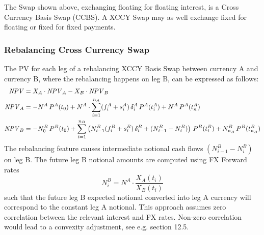 \medskip
The Swap shown above, exchanging floating for floating interest, is a Cross Currency 
Basis Swap (CCBS). A XCCY Swap may as well exchange fixed for floating or 
fixed for fixed payments. 

\subsubsection*{Rebalancing Cross Currency Swap}

The PV for each leg of a rebalancing XCCY Basis Swap between currency A and currency B, 
where the rebalancing happens on leg B, can be expressed as follows:
\begin{align*}
\mathit{NPV} &= X_A\cdot \mathit{NPV}_A - X_B\cdot \mathit{NPV}_B \\
\mathit{NPV}_A &= -N^A \,P^A(t_0) + N^A\cdot \sum_{i=1}^{n_A} (f^A_i + s^A_i)\,\delta^A_i \, P^A(t_i^A) + N^A\,P^A(t_n^A) \\
\mathit{NPV}_B & =-N_0^B \,P^B(t_0)
+\sum_{i=1}^{n_B} \left(N_{i-1}^B (f^B_i +s^B_i)\,\delta^B_i +(N_{i-1}^B-N_i^B)\right) \, P^B(t_i^B) 
 + N_{n_B}^B\,P^B(t_{n_B}^B)
\end{align*}
The rebalancing feature causes intermediate notional cash flows $(N^B_{i-1} - N^B_i)$ 
on leg B. The future leg B notional amounts are computed using FX Forward rates
$$
N^B_i = N^A \cdot \frac{X_A(t_i)}{X_B(t_i)} 
$$
such that the future leg B expected notional converted into leg A currency will correspond to 
the constant leg A notional. This approach assumes zero correlation between the
relevant interest and FX rates. Non-zero correlation would lead to a convexity
adjustment, see e.g. \cite{LSG_2015} section 12.5.
